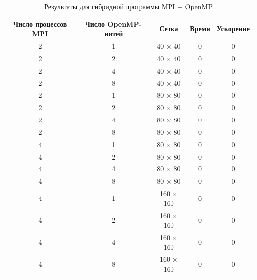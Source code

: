 \documentclass[oneside,final,14pt]{extreport}
\begin{document}
\begin{table}[h!]
\begin{tabular}{|c|c|c|c|c|}
\hline
Число процессов MPI & Число OpenMP-нитей & Сетка & Время & Ускорение \\
\hline
2 & 1 & 40 \(\times\) 40 & 0 & 0 \\
2 & 2 & 40 \(\times\) 40 & 0 & 0 \\
2 & 4 & 40 \(\times\) 40 & 0 & 0 \\
2 & 8 & 40 \(\times\) 40 & 0 & 0 \\
\hline
2 & 1 & 80 \(\times\) 80 & 0 & 0 \\
2 & 2 & 80 \(\times\) 80 & 0 & 0 \\
2 & 4 & 80 \(\times\) 80 & 0 & 0 \\
2 & 8 & 80 \(\times\) 80 & 0 & 0 \\
\hline
4 & 1 & 80 \(\times\) 80 & 0 & 0 \\
4 & 2 & 80 \(\times\) 80 & 0 & 0 \\
4 & 4 & 80 \(\times\) 80 & 0 & 0 \\
4 & 8 & 80 \(\times\) 80 & 0 & 0 \\
\hline
4 & 1 & 160 \(\times\) 160 & 0 & 0 \\
4 & 2 & 160 \(\times\) 160 & 0 & 0 \\
4 & 4 & 160 \(\times\) 160 & 0 & 0 \\
4 & 8 & 160 \(\times\) 160 & 0 & 0 \\
\hline
\end{tabular}
\caption{Результаты для гибридной программы MPI + OpenMP}
\label{tab4}
\end{table}

\newpage
\end{document}
